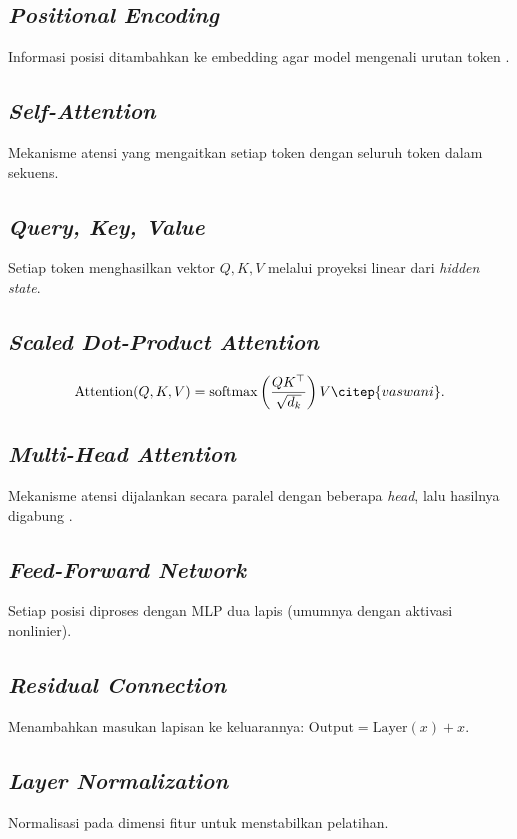 \subsection{\textit{Positional Encoding}}
Informasi posisi ditambahkan ke embedding agar model mengenali urutan token \citep{roformer}.

\subsection{\textit{Self-Attention}}
Mekanisme atensi yang mengaitkan setiap token dengan seluruh token dalam sekuens.

\subsection{\textit{Query, Key, Value}}
Setiap token menghasilkan vektor \(Q, K, V\) melalui proyeksi linear dari \textit{hidden state}.

\subsection{\textit{Scaled Dot-Product Attention}}
\begin{equation}
\text{Attention}(Q,K,V) = \operatorname{softmax}\left(\frac{QK^\top}{\sqrt{d_k}}\right) V \citep{vaswani}.
\end{equation}

\subsection{\textit{Multi-Head Attention}}
Mekanisme atensi dijalankan secara paralel dengan beberapa \textit{head}, lalu hasilnya digabung \citep{ainslie}.

\subsection{\textit{Feed-Forward Network}}
Setiap posisi diproses dengan MLP dua lapis (umumnya dengan aktivasi nonlinier).

\subsection{\textit{Residual Connection}}
Menambahkan masukan lapisan ke keluarannya: \(\text{Output} = \text{Layer}(x) + x\).

\subsection{\textit{Layer Normalization}}
Normalisasi pada dimensi fitur untuk menstabilkan pelatihan.

